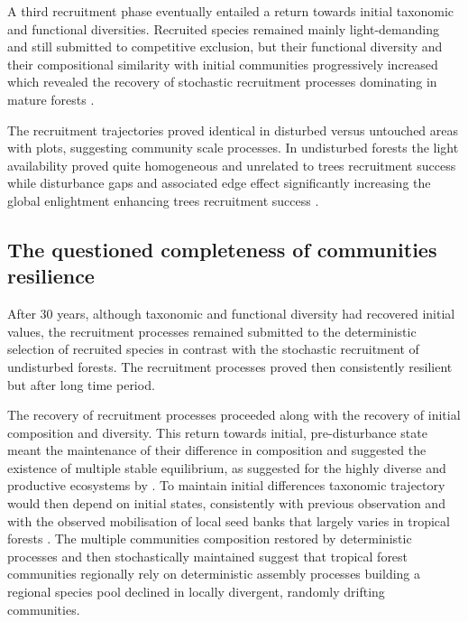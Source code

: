 \documentclass[fleqn,10pt]{ArtEcoFoG} %
\begin{document}
A third recruitment phase eventually entailed a return towards initial
taxonomic and functional diversities. Recruited species remained mainly
light-demanding and still submitted to competitive exclusion, but their
functional diversity and their compositional similarity with initial
communities progressively increased which revealed the recovery of
stochastic recruitment processes dominating in mature forests
\citep{Lawton1988, Mayfield2010}.

The recruitment trajectories proved identical in disturbed versus
untouched areas with plots, suggesting community scale processes. In
undisturbed forests the light availability proved quite homogeneous and
unrelated to trees recruitment success \citep{Dalling2002} while
disturbance gaps and associated edge effect significantly increasing the
global enlightment enhancing trees recruitment success
\citep{Ruger2009}.

\subsection{The questioned completeness of communities
resilience}\label{the-questioned-completeness-of-communities-resilience}

After 30 years, although taxonomic and functional diversity had
recovered initial values, the recruitment processes remained submitted
to the deterministic selection of recruited species in contrast with the
stochastic recruitment of undisturbed forests. The recruitment processes
proved then consistently resilient but after long time period.

The recovery of recruitment processes proceeded along with the recovery
of initial composition and diversity. This return towards initial,
pre-disturbance state meant the maintenance of their difference in
composition and suggested the existence of multiple stable equilibrium,
as suggested for the highly diverse and productive ecosystems by
\citet{Chase2003}. To maintain initial differences taxonomic trajectory
would then depend on initial states, consistently with previous
observation and with the observed mobilisation of local seed banks that
largely varies in tropical forests \citep{Dalling2002, Anderson2007}.
The multiple communities composition restored by deterministic processes
and then stochastically maintained suggest that tropical forest
communities regionally rely on deterministic assembly processes building
a regional species pool declined in locally divergent, randomly drifting
communities.
\end{document}
